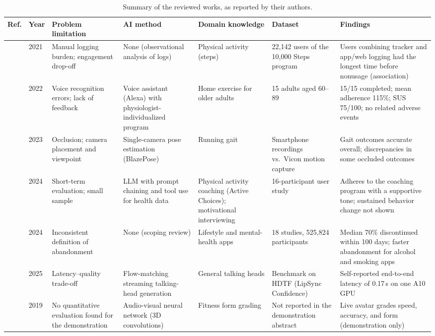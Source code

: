 \begin{table}[t]
\caption{Summary of the reviewed works, as reported by their authors.}
\label{tab:summary}
\centering
\footnotesize
\begin{tabular}{p{1.6cm}p{0.6cm}p{3.1cm}p{2.9cm}p{2.6cm}p{2.6cm}p{3.6cm}}
\toprule
Ref. & Year & Problem limitation & AI method & Domain knowledge & Dataset & Findings \\
\midrule
\cite{rayward2021} & 2021 & Manual logging burden; engagement drop-off & None (observational analysis of logs) & Physical activity (steps) & 22,142 users of the 10,000 Steps program & Users combining tracker and app/web logging had the longest time before nonusage (association) \\
\cite{jansons2022} & 2022 & Voice recognition errors; lack of feedback & Voice assistant (Alexa) with physiologist-individualized program & Home exercise for older adults & 15 adults aged 60--89 & 15/15 completed; mean adherence 115\%; SUS 75/100; no related adverse events \\
\cite{young2023} & 2023 & Occlusion; camera placement and viewpoint & Single-camera pose estimation (BlazePose) & Running gait & Smartphone recordings vs.\ Vicon motion capture & Gait outcomes accurate overall; discrepancies in some occluded outcomes \\
\cite{jorke2024} & 2024 & Short-term evaluation; small sample & LLM with prompt chaining and tool use for health data & Physical activity coaching (Active Choices); motivational interviewing & 16-participant user study & Adheres to the coaching program with a supportive tone; sustained behavior change not shown \\
\cite{kidman2024} & 2024 & Inconsistent definition of abandonment & None (scoping review) & Lifestyle and mental-health apps & 18 studies, 525,824 participants & Median 70\% discontinued within 100 days; faster abandonment for alcohol and smoking apps \\
\cite{liu2025livatar} & 2025 & Latency--quality trade-off & Flow-matching streaming talking-head generation & General talking heads & Benchmark on HDTF (LipSync Confidence) & Self-reported end-to-end latency of 0.17\,s on one A10 GPU \\
\cite{memisevic2019millie} & 2019 & No quantitative evaluation found for the demonstration & Audio-visual neural network (3D convolutions) & Fitness form grading & Not reported in the demonstration abstract & Live avatar grades speed, accuracy, and form (demonstration only) \\
\bottomrule
\end{tabular}
\end{table}

